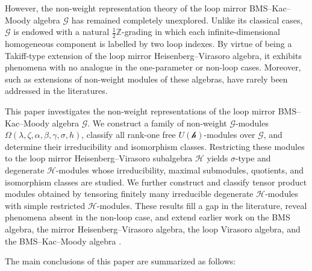 \documentclass[12pt,reqno]{amsart}
\numberwithin{equation}{section}
\begin{document}
However, the non-weight representation theory of the loop mirror BMS--Kac--Moody algebra \(\mathcal{G}\) has remained completely unexplored. Unlike its classical cases, \(\mathcal{G}\) is endowed with a natural \(\frac{1}{2}\mathbb{Z}\)-grading in which  each infinite-dimensional homogeneous component is labelled by two loop indexes. By virtue of being a Takiff-type extension of the loop mirror Heisenberg--Virasoro algebra, it exhibits phenomena with no analogue in the one-parameter or non-loop cases. Moreover, such as extensions of non-weight modules of these algebras, have rarely been addressed in the literatures.

 

This paper investigates the non-weight representations of the loop mirror BMS--Kac--Moody algebra \(\mathcal{G}\). We 
 construct a family of non-weight \(\mathcal{G}\)-modules \(\Omega(\lambda,\zeta,\alpha,\beta,\gamma,\sigma,h)\), classify all rank-one free \(U(\mathcal{h})\)-modules over \(\mathcal{G}\), and determine their irreducibility and isomorphism classes. Restricting these modules to the loop mirror Heisenberg--Virasoro subalgebra \(\mathcal{H}\) yields \(\sigma\)-type and degenerate \(\mathcal{H}\)-modules whose irreducibility, maximal submodules, quotients, and isomorphism classes are studied. We further construct and classify tensor product modules obtained by tensoring finitely many irreducible degenerate \(\mathcal{H}\)-modules with simple restricted \(\mathcal{H}\)-modules. These results fill a gap in the literature, reveal phenomena absent in the non-loop case, and extend earlier work on the BMS algebra, the mirror Heisenberg--Virasoro algebra, the loop Virasoro algebra, and the BMS--Kac--Moody algebra \cite{CB,CG,CY,GMZ}.


 
 

The main conclusions of this paper are summarized as follows:
\end{document}
